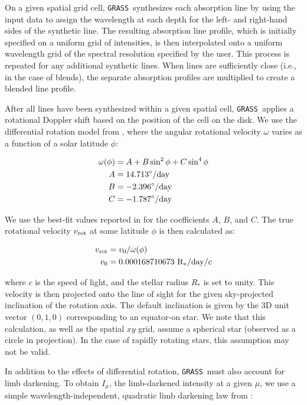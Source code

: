 \documentclass[twocolumn]{aastex63}
\newcommand{\grass}{\texttt{GRASS}}
\begin{document}
On a given spatial grid cell, \grass\ synthesizes each absorption line by using the input data to assign the wavelength at each depth for the left- and right-hand sides of the synthetic line. The resulting absorption line profile, which is initially specified on a uniform grid of intensities, is then interpolated onto a uniform wavelength grid of the spectral resolution specified by the user. This process is repeated for any additional synthetic lines. When lines are sufficiently close (i.e., in the case of blends), the separate absorption profiles are multiplied to create a blended line profile.  \par 

After all lines have been synthesized within a given spatial cell, \grass\ applies a rotational Doppler shift based on the position of the cell on the disk. We use the differential rotation model from \citet{Snodgrass1990}, where the angular rotational velocity $\omega$ varies as a function of a solar latitude $\phi$:

\begin{align}
    \omega(\phi) &= A + B \sin^2\phi + C \sin^4 \phi \\
    A &= 14.713 ^{\circ}/{\rm day} \\
    B &= -2.396 ^{\circ}/{\rm day} \\
    C &= -1.787 ^{\circ}/{\rm day}
\end{align}

\noindent We use the best-fit values reported in \citet{Snodgrass1990} for the coefficients $A$, $B$, and $C$. The true rotational velocity $v_{\rm rot}$ at some latitude $\phi$ is then calculated as:

\begin{align}
    v_{\rm rot} &= v_0 / \omega(\phi) \\
    v_0 &= 0.000168710673\ {\rm R_*/day/}c
\end{align}

\noindent where $c$ is the speed of light, and the stellar radius $R_*$ is set to unity. This velocity is then projected onto the line of sight for the given sky-projected inclination of the rotation axis. The default inclination is given by the 3D unit vector $(0,1,0)$ corresponding to an equator-on star. We note that this calculation, as well as the spatial $xy$ grid, assume a spherical star (observed as a circle in projection). In the case of rapidly rotating stars, this assumption may not be valid. \par 

In addition to the effects of differential rotation, \grass\ must also account for limb darkening. To obtain $I_\mu$, the limb-darkened intensity at a given $\mu$, we use a simple wavelength-independent, quadratic limb darkening law from \citet{Kopal1950}:
\end{document}

